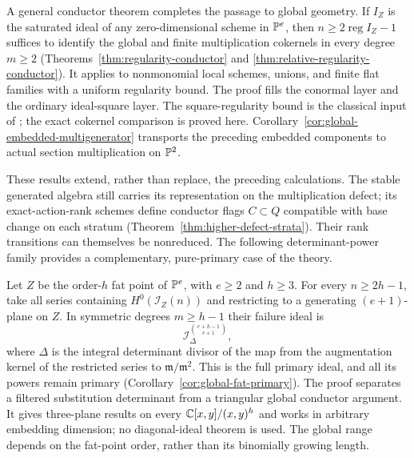 A general conductor theorem completes the passage to global geometry.
If $I_Z$ is the saturated ideal of any zero-dimensional scheme in
$\mathbb P^e$, then $n\ge2\operatorname{reg}I_Z-1$ suffices to identify
the global and finite multiplication cokernels in every degree $m\ge2$
(Theorems~\ref{thm:regularity-conductor} and
\ref{thm:relative-regularity-conductor}). It applies to nonmonomial
local schemes, unions, and finite flat families with a uniform
regularity bound. The proof fills the conormal layer and the ordinary
ideal-square layer. The square-regularity bound is the classical
input of \cite[Theorem 1.8]{Sidman}; the exact cokernel comparison
is proved here. Corollary~\ref{cor:global-embedded-multigenerator}
transports the preceding embedded components to actual section
multiplication on $\mathbb P^2$.

These results extend, rather than replace, the preceding calculations.
The stable generated algebra still carries its representation on the
multiplication defect; its exact-action-rank schemes define conductor
flags $C\subset Q$ compatible with base change on each stratum
(Theorem~\ref{thm:higher-defect-strata}). Their rank transitions can
themselves be nonreduced. The following determinant-power family
provides a complementary, pure-primary case of the theory.

Let $Z$ be the order-$h$ fat point of $\mathbb P^e$, with $e\ge2$
and $h\ge3$. For every $n\ge2h-1$, take all series containing
$H^0(\mathcal I_Z(n))$ and restricting to a generating $(e+1)$-plane
on $Z$. In symmetric degrees $m\ge h-1$ their failure ideal is
\begin{equation}\label{eq:intro-fat-main}
 \mathcal I_\Delta^{\binom{e+h-1}{e+1}},
\end{equation}
where $\Delta$ is the integral determinant divisor of the map from
the augmentation kernel of the restricted series to
$\mathfrak m/\mathfrak m^2$. This is the full primary ideal, and
all its powers remain primary (Corollary~\ref{cor:global-fat-primary}).
The proof separates a filtered substitution determinant from a
triangular global conductor argument. It gives three-plane results
on every $\mathbb C[x,y]/(x,y)^h$ and works in arbitrary embedding dimension;
no diagonal-ideal theorem is used. The global range depends on the
fat-point order, rather than its binomially growing length.


